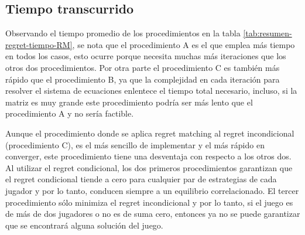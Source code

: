 \subsection{Tiempo transcurrido}

Observando el tiempo promedio de los procedimientos en la tabla \ref{tab:resumen-regret-tiempo-RM}, se nota que el procedimiento A es el que emplea más tiempo en todos los casos, esto ocurre porque necesita muchas más iteraciones que los otros dos procedimientos. Por otra parte el procedimiento C es también más rápido que el procedimiento B, ya que la complejidad en cada iteración para resolver el sistema de ecuaciones enlentece el tiempo total necesario, incluso, si la matriz es muy grande este procedimiento podría ser más lento que el procedimiento A y no sería factible.

Aunque el procedimiento donde se aplica regret matching al regret incondicional (procedimiento C), es el más sencillo de implementar y el más rápido en converger, este procedimiento tiene una desventaja con respecto a los otros dos. Al utilizar el regret condicional, los dos primeros procedimientos garantizan que el regret condicional tiende a cero para cualquier par de estrategias de cada jugador y por lo tanto, conducen siempre a un equilibrio correlacionado. El tercer procedimiento sólo minimiza el regret incondicional y por lo tanto, si el juego es de más de dos jugadores o no es de suma cero, entonces ya no se puede garantizar que se encontrará alguna solución del juego.


